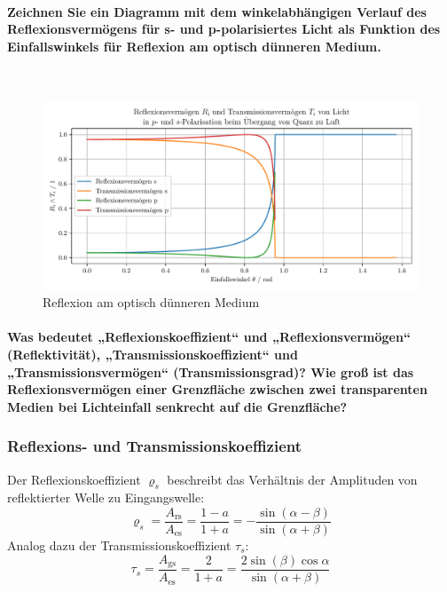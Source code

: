 \documentclass[a4paper, 11pt, ngerman, parskip=half-]{scrartcl}
\newcommand{\myparagraph}[1]{\paragraph{#1}\mbox{}\\}
\begin{document}
\myparagraph{Zeichnen Sie ein Diagramm mit dem winkelabhängigen Verlauf des Reflexionsvermögens für s- und p-polarisiertes Licht als Funktion des Einfallswinkels für Reflexion am optisch dünneren Medium.}
%
\begin{figure}[H]
    \centering
    \begin{samepage}
        \includegraphics[width=\textwidth]{image/15/Quarz_zu_Luft.pdf}
        \caption{Reflexion am optisch dünneren Medium}
        \label{fig:reflexion_duenn}
    \end{samepage}
\end{figure}


\paragraph{Was bedeutet „Reflexionskoeffizient“ und „Reflexionsvermögen“ (Reflektivität), „Transmissionskoeffizient“ und „Transmissionsvermögen“ (Transmissionsgrad)? Wie groß ist das Reflexionsvermögen einer Grenzfläche zwischen zwei transparenten Medien bei Lichteinfall senkrecht auf die Grenzfläche?}
%
\subsubsection*{Reflexions- und Transmissionskoeffizient}
Der Reflexionskoeffizient $\varrho_s$ beschreibt das Verhältnis der Amplituden von reflektierter Welle zu Eingangswelle:
%
\begin{equation}
    \label{eq:reflexionskoeffizient}
    \varrho_s = \frac{A_{\text{rs}}}{A_{\text{es}}} = \frac{1-a}{1+a} = -\frac{\sin (\alpha - \beta)}{\sin (\alpha + \beta)}
\end{equation}
%
Analog dazu der Transmissionskoeffizient $\tau_s$:
%
\begin{equation}
    \label{eq:transmissionskoeffizient}
    \tau_s = \frac{A_{\text{gs}}}{A_{\text{es}}} = \frac{2}{1+a} = \frac{2 \sin (\beta) \cos{\alpha}}{\sin (\alpha + \beta)}
\end{equation}
%
\end{document}
